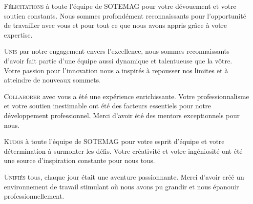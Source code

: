 \documentclass[a4paper, 11pt, openany]{report}
\begin{document}

\newpage
\listoffigures
\listoftables
\listofcodes
\newpage

\tableofcontents
\newpage

\begin{remerciement}

\lettrine[nindent=0em, slope=-.5em]{\color{Eblue}F}{élicitations} à toute l'équipe de SOTEMAG pour votre dévouement et votre soutien constants. Nous sommes profondément reconnaissants pour l'opportunité de travailler avec vous et pour tout ce que nous avons appris grâce à votre expertise.

\vspace{0.5cm}

\lettrine[nindent=0em, slope=-.5em]{\color{Eblue}U}{nis} par notre engagement envers l'excellence, nous sommes reconnaissants d'avoir fait partie d'une équipe aussi dynamique et talentueuse que la vôtre. Votre passion pour l'innovation nous a inspirés à repousser nos limites et à atteindre de nouveaux sommets.

\vspace{0.5cm}

\lettrine[nindent=0em, slope=-.5em]{\color{Eblue}C}{ollaborer} avec vous a été une expérience enrichissante. Votre professionnalisme et votre soutien inestimable ont été des facteurs essentiels pour notre développement professionnel. Merci d'avoir été des mentors exceptionnels pour nous.

\vspace{0.5cm}

\lettrine[nindent=0em, slope=-.5em]{\color{Eblue}K}{udos} à toute l'équipe de SOTEMAG pour votre esprit d'équipe et votre détermination à surmonter les défis. Votre créativité et votre ingéniosité ont été une source d'inspiration constante pour nous tous.

\vspace{0.5cm}

\lettrine[nindent=0em, slope=-.5em]{\color{Eblue}U}{nifiés} tous, chaque jour était une aventure passionnante. Merci d'avoir créé un environnement de travail stimulant où nous avons pu grandir et nous épanouir professionnellement.

\end{remerciement}
\end{document}
